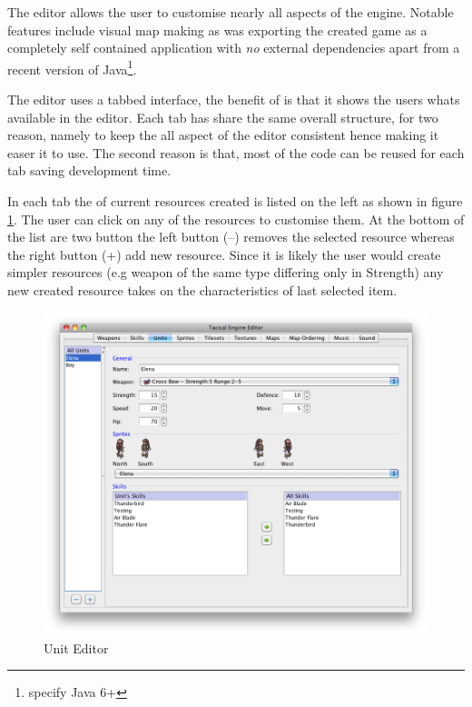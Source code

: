 The editor allows the user to customise nearly all aspects of the engine.  Notable features include visual map making as was exporting the created game as a completely self contained application with \emph{no} external dependencies apart from a recent version of Java\footnote{specify Java 6+}. 

The editor uses a tabbed interface, the benefit of is that it shows the users whats available in the editor. Each tab has share the same overall structure, for two reason, namely to keep the all aspect of the editor consistent hence making it easer it to use. The second reason is that, most of the code can be reused for each tab saving development time. 

In each tab the of current resources created is listed on the left as shown in figure \ref{fig:figures_editor_Units}. The user can click on any of the resources to customise them. At the bottom of the list are two button the left button (--) removes the selected resource whereas the right button (+) add new resource. Since it is likely the user would create simpler resources (e.g  weapon of the same type differing only in Strength) any new created resource takes on the characteristics of last selected item.

\begin{figure}[htbp]
	\centering
		\includegraphics[width=\textwidth]{figures/editor/Units.png}
	\caption{Unit Editor}
	\label{fig:figures_editor_Units}
\end{figure}


